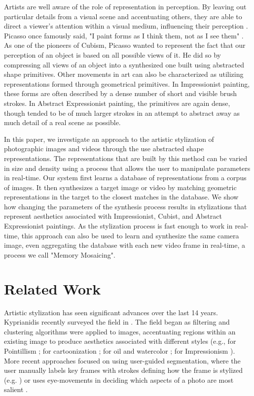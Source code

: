 \documentclass[a4paper,11pt,final]{ThesisStyle}
\begin{document}
Artists are well aware of the role of representation in perception.  By leaving out particular details from a visual scene and accentuating others, they are able to direct a viewer's attention within a visual medium, influencing their perception \cite{Haeberli1990,Zimmer2003}.  Picasso once famously said, "I paint forms as I think them, not as I see them" \cite{Hughes1991}.  As one of the pioneers of Cubism, Picasso wanted to represent the fact that our perception of an object is based on all possible views of it.  He did so by compressing all views of an object into a synthesized one built using abstracted shape primitives.  Other movements in art can also be characterized as utilizing representations formed through geometrical primitives.  In Impressionist painting, these forms are often described by a dense number of short and visible brush strokes.  In Abstract Expressionist painting, the primitives are again dense, though tended to be of much larger strokes in an attempt to abstract away as much detail of a real scene as possible.

In this paper, we investigate an approach to the artistic stylization of photographic images and videos through the use abstracted shape representations.  The representations that are built by this method can be varied in size and density using a process that allows the user to manipulate parameters in real-time.  Our system first learns a database of representations from a corpus of images.  It then synthesizes a target image or video by matching geometric representations in the target to the closest matches in the database.  We show how changing the parameters of the synthesis process results in stylizations that represent aesthetics associated with Impressionist, Cubist, and Abstract Expressionist paintings.  As the stylization process is fast enough to work in real-time, this approach can also be used to learn and synthesize the same camera image, even aggregating the database with each new video frame in real-time, a process we call "Memory Mosaicing".  
\section{Related Work}  
Artistic stylization has seen significant advances over the last 14 years.  Kyprianidis recently surveyed the field in \cite{Kyprianidis2012}.  The field began as filtering and clustering algorithms were applied to images, accentuating regions within an existing image to produce aesthetics associated with different styles (e.g., for Pointillism \cite{Yang2006,Seo2010}; for cartoonization \cite{Wang2004}; for oil and watercolor \cite{Meier1996,Hertzmann2000,Bousseau2007,Gooch2002}; for Impressionism \cite{Litwinowicz1997,Hertzmann1998}).  More recent approaches focused on using user-guided segmentation, where the user manually labels key frames with strokes defining how the frame is stylized (e.g. \cite{O'Donovan2012}) or uses eye-movements in deciding which aspects of a photo are most salient \cite{DeCarlo2002}.
\end{document}
